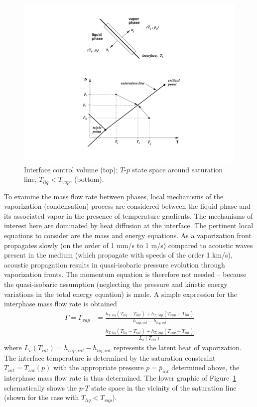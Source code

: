 \begin{figure}
  \centering
   \includegraphics[clip=true,viewport=200 50 550 500,width=.8\textwidth]{figures/SEM/saturation}
   \caption{Interface control volume (top); $T$-$p$ state space around
     saturation line, $T_{liq} < T_{vap}$, (bottom).\label{Berry-Fig:2}}
\end{figure}

To examine the mass flow rate between phases, local mechanisms of the
vaporization (condensation) process are considered between the liquid
phase and its associated vapor in the presence of temperature
gradients.  The mechanisms of interest here are dominated by heat
diffusion at the interface.  The pertinent local equations to consider
are the mass and energy equations.  As a vaporization front propagates
slowly (on the order of 1 mm/s to 1 m/s) compared to acoustic waves
present in the medium (which propagate with speeds of the order 1
km/s), acoustic propagation results in quasi-isobaric pressure
evolution through vaporization fronts.  The momentum equation is
therefore not needed -- because the quasi-isobaric assumption
(neglecting the pressure and kinetic energy variations in the total
energy equation) is made.  A simple expression for the interphase
mass flow rate is obtained
\begin{align}
  \nonumber
  \Gamma = \Gamma_{vap}
  &= \frac{h_{T,  liq} \left( T_{liq} - T_{int} \right) + h_{T,  vap} \left( T_{vap} - T_{int} \right)}{h_{vap,  int} - h_{liq,  int}}
  \\
  &= \frac{h_{T,  liq} \left( T_{liq} - T_{int} \right) + h_{T,  vap} \left( T_{vap} - T_{int} \right)}{L_v \left( T_{int} \right)}
\end{align}
where $L_v \left( T_{int} \right) = h_{vap,  int} - h_{liq,  int}$
represents the latent heat of vaporization.  The interface
temperature is determined by the saturation constraint
$T_{int}=T_{sat}(p)$ with the appropriate pressure $p=\bar{p}_{int}$
determined above, the interphase mass flow rate is thus determined.
The lower graphic of Figure~\ref{Berry-Fig:2} schematically shows the
$p$-$T$ state space in the vicinity of the saturation line (shown
for the case with $T_{liq} < T_{vap}$).

